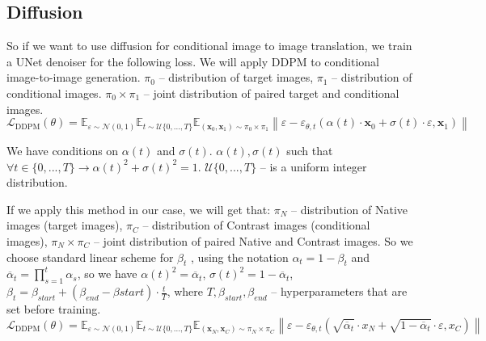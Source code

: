 \documentclass{article}
\begin{document}
\subsection{Diffusion}
So if we want to use diffusion for conditional image to image translation, we train a UNet denoiser for the following loss. We will apply DDPM \citep{ho2020denoising} to conditional image-to-image generation. $\pi_{0}$ -- distribution of target images, $\pi_{1}$ -- distribution of conditional images. $\pi_{0} \times \pi_{1}$ -- joint distribution of paired target and conditional images. 
\begin{equation}
    \mathcal{L}_{\text{DDPM}}(\theta) = \mathbb{E}_{\varepsilon \sim \mathcal{N}(0, 1)}\mathbb{E}_{t \sim \mathcal{U}\{0, ..., T\}}\mathbb{E}_{(\mathbf{x}_{0},\mathbf{x}_{1}) \sim \pi_{0} \times \pi_{1}} \left\lVert \varepsilon - \varepsilon_{\theta, t} \left(\alpha(t) \cdot \mathbf{x}_0 + \sigma(t)\cdot \varepsilon, \mathbf{x}_1\right)\right\rVert
    \label{eq:gen_ddpm_loss}
\end{equation}

We have conditions on $\alpha(t)$ and $\sigma(t)$. $\alpha(t), \sigma(t)$ such that $\forall t \in \{0, ..., T\} \xrightarrow{} \alpha(t)^2 + \sigma(t)^2 = 1$. $\mathcal{U} \{0, ..., T\}$ -- is a uniform integer distribution.

If we apply this method in our case, we will get that:
$\pi_{N}$ -- distribution of Native images (target images), $\pi_{C}$ -- distribution of Contrast images (conditional images), $\pi_{N} \times \pi_{C}$ -- joint distribution of paired Native and Contrast images.
So we choose standard linear scheme for $\beta_t$ \citep{ho2020denoising}, using the notation $\alpha_t = 1-\beta_t$ and $\overline{\alpha}_t = \prod\limits_{s=1}^{t}\alpha_s$, so we have $\alpha(t)^2 = \overline{\alpha}_t$,  $\sigma(t)^2 = 1-\overline{\alpha}_t$, $\beta_t = \beta_{start} + (\beta_{end}-\beta{start})\cdot\frac{t}{T}$, where $T, \beta_{start}, \beta_{end}$ -- hyperparameters that are set before training.
\begin{equation}
    \mathcal{L}_{\text{DDPM}}(\theta) = \mathbb{E}_{\varepsilon \sim \mathcal{N}(0, 1)}\mathbb{E}_{t \sim \mathcal{U}\{0, ..., T\}}\mathbb{E}_{(\mathbf{x}_{N},\mathbf{x}_{C}) \sim \pi_{N} \times \pi_{C}} \left\lVert \varepsilon - \varepsilon_{\theta, t} \left(\sqrt{\overline{\alpha}_t} \cdot x_N + \sqrt{1-\overline{\alpha}_t}\cdot \varepsilon, x_C\right)\right\rVert
    \label{eq:ddpm_loss}
\end{equation}
\end{document}
